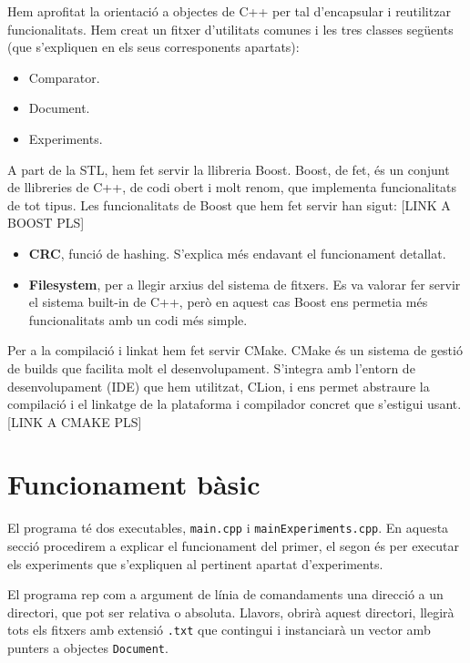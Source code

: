 \documentclass[catalan, 12pt]{report}
\begin{document}
Hem aprofitat la orientació a objectes de C++ per tal d'encapsular i reutilitzar funcionalitats. Hem creat un fitxer d'utilitats comunes i les tres classes següents (que s'expliquen en els seus corresponents apartats):

\begin{itemize}
\item Comparator.
\item Document.
\item Experiments.
\end{itemize}


A part de la STL, hem fet servir la llibreria Boost. Boost, de fet, és un conjunt de llibreries de C++, de codi obert i molt renom, que implementa funcionalitats de tot tipus. Les funcionalitats de Boost que hem fet servir han sigut: [LINK A BOOST PLS]

\begin{itemize}
\item \textbf{CRC}, funció de hashing. S'explica més endavant el funcionament detallat.
\item \textbf{Filesystem}, per a llegir arxius del sistema de fitxers. Es va valorar fer servir el sistema built-in de C++, però en aquest cas Boost ens permetia més funcionalitats amb un codi més simple.
\end{itemize}

Per a la compilació i linkat hem fet servir CMake. CMake és un sistema de gestió de builds que facilita molt el desenvolupament. S'integra amb l'entorn de desenvolupament (IDE) que hem utilitzat, CLion, i ens permet abstraure la compilació i el linkatge de la plataforma i compilador concret que s'estigui usant. [LINK A CMAKE PLS]

\section{Funcionament bàsic}

El programa té dos executables, \verb|main.cpp| i \verb|mainExperiments.cpp|. En aquesta secció procedirem a explicar el funcionament del primer, el segon és per executar els experiments que s'expliquen al pertinent apartat d'experiments.

El programa rep com a argument de línia de comandaments una direcció a un directori, que pot ser relativa o absoluta. Llavors, obrirà aquest directori, llegirà tots els fitxers amb extensió \verb|.txt| que contingui i instanciarà un vector amb punters a objectes \verb|Document|.
\end{document}
